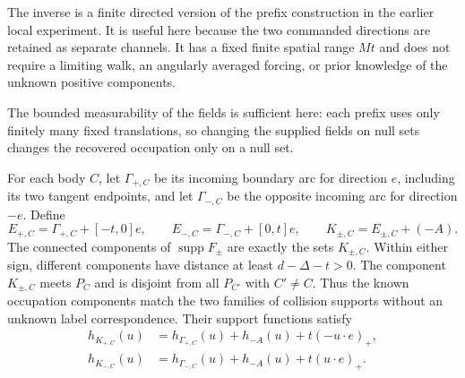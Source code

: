 The inverse is a finite directed version of the prefix construction
in the earlier local experiment.  It is useful here because the
two commanded directions are retained as separate channels.
It has a fixed finite spatial range $Mt$ and does not require a
limiting walk, an angularly averaged forcing, or prior knowledge of
the unknown positive components.

The bounded measurability of the fields is sufficient here: each
prefix uses only finitely many fixed translations, so changing
the supplied fields on null sets changes the recovered occupation
only on a null set.



\begin{lemma}
\label{lem:two-field-supports}
For each body $C$, let $\Gamma_{+,C}$ be its incoming boundary arc
for direction $e$, including its two tangent endpoints, and let
$\Gamma_{-,C}$ be the opposite incoming arc for direction $-e$.
Define
\begin{equation}\label{eq:two-field-strips}
 E_{+,C}=\Gamma_{+,C}+[-t,0]e,\qquad
 E_{-,C}=\Gamma_{-,C}+[0,t]e,
 \qquad K_{\pm,C}=E_{\pm,C}+(-A).
\end{equation}
The connected components of $\operatorname{supp}F_\pm$ are exactly
the sets $K_{\pm,C}$.  Within either sign, different components
have distance at least $d-\Delta-t>0$.
The component $K_{\pm,C}$ meets $P_C$ and is disjoint from all
$P_{C'}$ with $C'\ne C$.  Thus the known occupation components
match the two families of collision supports without an unknown
label correspondence.  Their support functions satisfy
\begin{align}
 h_{K_{+,C}}(u)
   &=h_{\Gamma_{+,C}}(u)+h_{-A}(u)+t(-u\cdot e)_+,
       \label{eq:two-field-plus-support}\\
 h_{K_{-,C}}(u)
   &=h_{\Gamma_{-,C}}(u)+h_{-A}(u)+t(u\cdot e)_+.
       \label{eq:two-field-minus-support}
\end{align}
\end{lemma}

